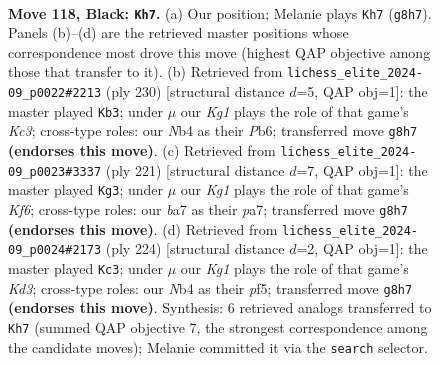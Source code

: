 \documentclass[11pt]{article}
\begin{document}
\clearpage

\begin{figure}[p]\centering
\begin{subfigure}{0.46\textwidth}\centering
\resizebox{\linewidth}{!}{%
\newchessgame
\chessboard[
  setfen={6k1/B7/8/7K/1nb2P2/8/8/8 b - - 0 118},
  showmover=false,
  pgfstyle=straightmove, color=movearrow, markmove={g8-h7}
]}
\caption{}
\end{subfigure}\hfill
\begin{subfigure}{0.46\textwidth}\centering
\resizebox{\linewidth}{!}{%
\newchessgame
\chessboard[
  setfen={8/8/1P3B2/8/8/2K2b2/8/1k6 w - - 59 116},
  showmover=false,
  pgfstyle=straightmove, color=movearrow, markmove={c3-b3}
]}
\caption{}
\end{subfigure}
\\[4pt]
\begin{subfigure}{0.46\textwidth}\centering
\resizebox{\linewidth}{!}{%
\newchessgame
\chessboard[
  setfen={b7/P7/8/8/8/5k2/8/6K1 b - - 45 111},
  showmover=false,
  pgfstyle=straightmove, color=movearrow, markmove={f3-g3}
]}
\caption{}
\end{subfigure}\hfill
\begin{subfigure}{0.46\textwidth}\centering
\resizebox{\linewidth}{!}{%
\newchessgame
\chessboard[
  setfen={8/8/8/5p2/7k/b2K4/8/5B2 w - - 6 113},
  showmover=false,
  pgfstyle=straightmove, color=movearrow, markmove={d3-c3}
]}
\caption{}
\end{subfigure}
\caption{\textbf{Move 118, Black: \texttt{Kh7}.} (a) Our position; Melanie plays \texttt{Kh7} (\texttt{g8h7}). Panels (b)--(d) are the retrieved master positions whose correspondence most drove this move (highest QAP objective among those that transfer to it). (b) Retrieved from \texttt{lichess\_elite\_2024-09\_p0022\#2213} (ply 230) [structural distance $d$=5, QAP obj=1]: the master played \texttt{Kb3}; under $\mu$ our \emph{Kg1} plays the role of that game's \emph{Kc3}; cross-type roles: our \emph{N}b4 as their \emph{P}b6; transferred move \texttt{g8h7} \textbf{(endorses this move)}. (c) Retrieved from \texttt{lichess\_elite\_2024-09\_p0023\#3337} (ply 221) [structural distance $d$=7, QAP obj=1]: the master played \texttt{Kg3}; under $\mu$ our \emph{Kg1} plays the role of that game's \emph{Kf6}; cross-type roles: our \emph{b}a7 as their \emph{p}a7; transferred move \texttt{g8h7} \textbf{(endorses this move)}. (d) Retrieved from \texttt{lichess\_elite\_2024-09\_p0024\#2173} (ply 224) [structural distance $d$=2, QAP obj=1]: the master played \texttt{Kc3}; under $\mu$ our \emph{Kg1} plays the role of that game's \emph{Kd3}; cross-type roles: our \emph{N}b4 as their \emph{p}f5; transferred move \texttt{g8h7} \textbf{(endorses this move)}. Synthesis: 6 retrieved analogs transferred to \texttt{Kh7} (summed QAP objective 7, the strongest correspondence among the candidate moves); Melanie committed it via the \texttt{search} selector.}
\label{fig:thought-m235}
\end{figure}
\end{document}
